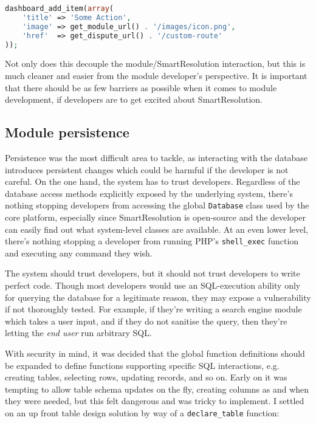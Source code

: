 \begin{lstlisting}[language=php]
dashboard_add_item(array(
    'title' => 'Some Action',
    'image' => get_module_url() . '/images/icon.png',
    'href'  => get_dispute_url() . '/custom-route'
));
\end{lstlisting}

Not only does this decouple the module/SmartResolution interaction, but this is much cleaner and easier from the module developer's perspective. It is important that there should be as few barriers as possible when it comes to module development, if developers are to get excited about SmartResolution.

\subsection{Module persistence}

Persistence was the most difficult area to tackle, as interacting with the database introduces persistent changes which could be harmful if the developer is not careful. On the one hand, the system has to trust developers. Regardless of the database access methods explicitly exposed by the underlying system, there's nothing stopping developers from accessing the global \lstinline{Database} class used by the core platform, especially since SmartResolution is open-source and the developer can easily find out what system-level classes are available. At an even lower level, there's nothing stopping a developer from running PHP's \lstinline{shell_exec} function and executing any command they wish.

The system should trust developers, but it should not trust developers to write perfect code. Though most developers would use an SQL-execution ability only for querying the database for a legitimate reason, they may expose a vulnerability if not thoroughly tested. For example, if they're writing a search engine module which takes a user input, and if they do not sanitise the query, then they're letting the \emph{end user} run arbitrary SQL.

With security in mind, it was decided that the global function definitions should be expanded to define functions supporting specific SQL interactions, e.g. creating tables, selecting rows, updating records, and so on. Early on it was tempting to allow table schema updates on the fly, creating columns as and when they were needed, but this felt dangerous and was tricky to implement. I settled on an up front table design solution by way of a \lstinline{declare_table} function:

